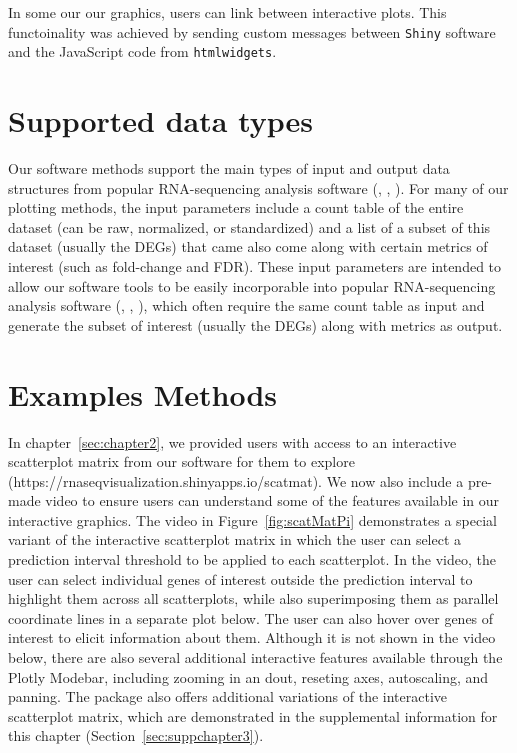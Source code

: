 \documentclass[11pt,a4paper,oldfontcommands,openany]{memoir}
\numberwithin{equation}{section} %
\newcommand{\pkg}[1]{{\texttt{#1}}}
\begin{document}
In some our our graphics, users can link between interactive plots. This functoinality was achieved by sending custom messages between \pkg{Shiny} software and the JavaScript code from \pkg{htmlwidgets}.

\section{Supported data types}

Our software methods support the main types of input and output data structures from popular RNA-sequencing analysis software (\citealt{deseq2}, \citealt{edger}, \citealt{limma}). For many of our plotting methods, the input parameters include a count table of the entire dataset (can be raw, normalized, or standardized) and a list of a subset of this dataset (usually the DEGs) that came also come along with certain metrics of interest (such as fold-change and FDR). These input parameters are intended to allow our software tools to be easily incorporable into popular RNA-sequencing analysis software (\citealt{deseq2}, \citealt{edger}, \citealt{limma}), which often require the same count table as input and generate the subset of interest (usually the DEGs) along with metrics as output. 

\section{Examples Methods}

In chapter~\ref{sec:chapter2}, we provided users with access to an interactive scatterplot matrix from our software for them to explore (https://rnaseqvisualization.shinyapps.io/scatmat). We now also include a pre-made video to ensure users can understand some of the features available in our interactive graphics. The video in Figure~\ref{fig:scatMatPi} demonstrates a special variant of the interactive scatterplot matrix in which the user can select a prediction interval threshold to be applied to each scatterplot. In the video, the user can select individual genes of interest outside the prediction interval to highlight them across all scatterplots, while also superimposing them as parallel coordinate lines in a separate plot below. The user can also hover over genes of interest to elicit information about them. Although it is not shown in the video below, there are also several additional interactive features available through the Plotly Modebar, including zooming in an dout, reseting axes, autoscaling, and panning. The package also offers additional variations of the interactive scatterplot matrix, which are demonstrated in the supplemental information for this chapter (Section~\ref{sec:suppchapter3}). 
\end{document}
